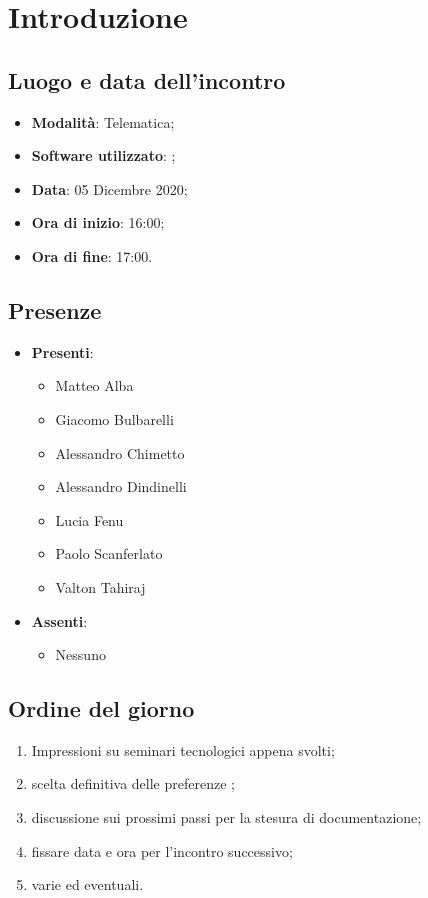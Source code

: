 \documentclass[]{article}
\begin{document}
	

	\newpage


	\section{Introduzione}
		\subsection{Luogo e data dell'incontro}
		\begin{itemize}
			\item \textbf{Modalità}: Telematica;
			\item \textbf{Software utilizzato}: ;
			\item \textbf{Data}: 05 Dicembre 2020;
			\item \textbf{Ora di inizio}: 16:00;
			\item \textbf{Ora di fine}: 17:00.
		\end{itemize}

		\subsection{Presenze}
		\begin{itemize}
			\item \textbf{Presenti}:
			\begin{itemize}
				\item Matteo Alba
				\item Giacomo Bulbarelli
				\item Alessandro Chimetto
				\item Alessandro Dindinelli
				\item Lucia Fenu
				\item Paolo Scanferlato
				\item Valton Tahiraj 
			\end{itemize}
			\item \textbf{Assenti}:
			\begin{itemize}
				\item Nessuno
			\end{itemize}
		\end{itemize}


		\subsection{Ordine del giorno}
		\begin{enumerate}
			\item Impressioni su seminari tecnologici appena svolti;
			\item scelta definitiva delle preferenze ;
			\item discussione sui prossimi passi per la stesura di documentazione;
			\item fissare data e ora per l'incontro successivo;
			\item varie ed eventuali.
		\end{enumerate}
\end{document}
